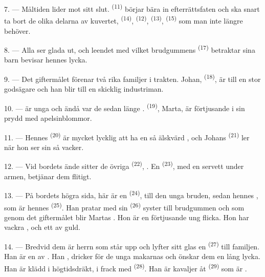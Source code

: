 7. --- Måltiden lider mot sitt slut.  \textsuperscript{(11)} börjar bära in
efterrättsfaten och ska snart ta bort de olika delarna av kuvertet, 
\textsuperscript{(14)},  \textsuperscript{(12)}, 
\textsuperscript{(13)},  \textsuperscript{(15)} som man inte längre behöver.

\VUsaut{3.0mm}

8. --- Alla ser glada ut, och leendet med vilket brudgummens 
\textsuperscript{(17)} betraktar sina barn bevisar hennes lycka.

9. --- Det giftermålet förenar två rika familjer i trakten. Johan,
 \textsuperscript{(18)}, är  till en stor godsägare
och han blir  till en skicklig industriman.

10. ---  är unga och ändå var de sedan länge
.  \textsuperscript{(19)}, Marta, är
förtjusande i sin  prydd med apelsinblommor.

11. --- Hennes  \textsuperscript{(20)} är mycket lycklig att ha en så älskvärd
, och Johans  \textsuperscript{(21)} ler när hon ser sin
 så vacker.

12. --- Vid bordets ände sitter de övriga  \textsuperscript{(22)},
. En
 \textsuperscript{(23)}, med en servett under armen, betjänar
dem flitigt.

\VUsaut{3.0mm}

13. --- På bordets högra sida, här är en  \textsuperscript{(24)},
 till den unga bruden, sedan hennes
, som är hennes  \textsuperscript{(25)}. Han
pratar med sin  \textsuperscript{(26)} syster till brudgummen och som genom det
giftermålet blir Martas . Hon är en förtjusande ung flicka. Hon har vackra
, och ett
 av guld.

14. --- Bredvid dem är herrn som står upp och lyfter sitt glas en 
\textsuperscript{(27)} till familjen. Han är en av . Han
, dricker för de unga makarnas
 och önskar dem en lång lycka. Han är klädd i högtidsdräkt, i frack
med  \textsuperscript{(28)}. Han är kavaljer åt
 \textsuperscript{(29)} som är .

